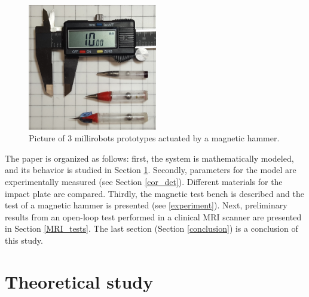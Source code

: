 \documentclass[letterpaper, 10 pt, conference]{ieeeconf}  %
\begin{document}
\begin{figure}
\begin{centering}
  \includegraphics[width=160pt]{robots_prototypes.jpg}
  \caption{Picture of 3 millirobots prototypes actuated by a magnetic hammer.}
  \label{prototypes}
\end{centering}
\end{figure}

The paper is organized as follows: first, the system is mathematically modeled, and its behavior is studied in Section \ref{theoretical}. Secondly, parameters for the model are experimentally measured (see Section \ref{cor_det}). Different materials for the impact plate are compared. Thirdly, the magnetic test bench is described and the test of a magnetic hammer is presented (see \cref{experiment}). Next, preliminary results from an open-loop test performed in a clinical MRI scanner are presented in Section \ref{MRI_tests}. The last section (Section \ref{conclusion}) is a conclusion of this study.


\section{Theoretical study}
\label{theoretical}
\end{document}
